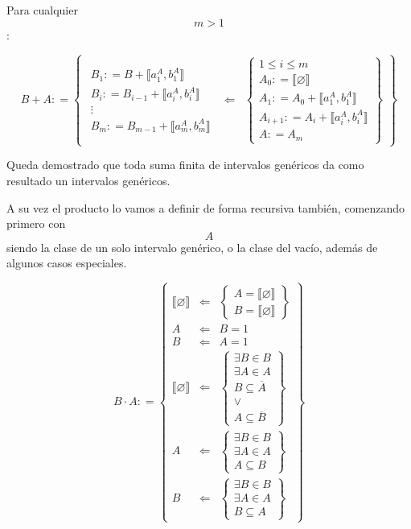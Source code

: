 \begin{enumerate}
  Para cualquier \[m > 1\]:

  \[{{B + A}{: =}}\begin{Bmatrix}
  \begin{matrix}
  {B_{1}{: = {B + {⟦{a_{1}^{A},b_{1}^{A}}⟧}}}} \\
  {B_{i}{: = {B_{i - 1} + {⟦{a_{i}^{A},b_{i}^{A}}⟧}}}} \\
   \vdots \\
  {B_{m}{: = {B_{m - 1} + {⟦{a_{m}^{A},b_{m}^{A}}⟧}}}}
  \end{matrix} & {\Leftarrow} & \begin{Bmatrix}
  {{1 \leq i} \leq m} \\
  {A_{0}{: = {⟦\varnothing ⟧}}} \\
  {A_{1}{: = {A_{0} + {⟦{a_{1}^{A},b_{1}^{A}}⟧}}}} \\
  {A_{i + 1}{: = {A_{i} + {⟦{a_{i}^{A},b_{i}^{A}}⟧}}}} \\
  {A{: = A_{m}}}
  \end{Bmatrix}
  \end{Bmatrix}\]

  Queda demostrado que toda suma finita de intervalos genéricos da como
  resultado un intervalos gené\-ricos.

  A su vez el producto lo vamos a definir de forma recursiva también,
  comenzando primero con \[A\] siendo la clase de un solo intervalo
  genérico, o la clase del vacío, además de algu\-nos casos especiales.

  \[{B \cdot A}{: =}\begin{Bmatrix}
  {⟦\varnothing ⟧} & {\Leftarrow} & \begin{Bmatrix}
  {A = {⟦\varnothing ⟧}} \\
  {B = {⟦\varnothing ⟧}}
  \end{Bmatrix} \\
  A & {\Leftarrow} & {B = 1} \\
  B & {\Leftarrow} & {A = 1} \\
  {⟦\varnothing ⟧} & {\Leftarrow} & \begin{Bmatrix}
  {\exists{B \in B}} \\
  {\exists{A \in A}} \\
  {B \subseteq \overline{A}} \\
   \vee \\
  {A \subseteq \overline{B}}
  \end{Bmatrix} \\
  A & {\Leftarrow} & \begin{Bmatrix}
  {\exists{B \in B}} \\
  {\exists{A \in A}} \\
  {A \subseteq B}
  \end{Bmatrix} \\
  B & {\Leftarrow} & \begin{Bmatrix}
  {\exists{B \in B}} \\
  {\exists{A \in A}} \\
  {B \subseteq A}
  \end{Bmatrix}
  \end{Bmatrix}\]
\end{enumerate}

